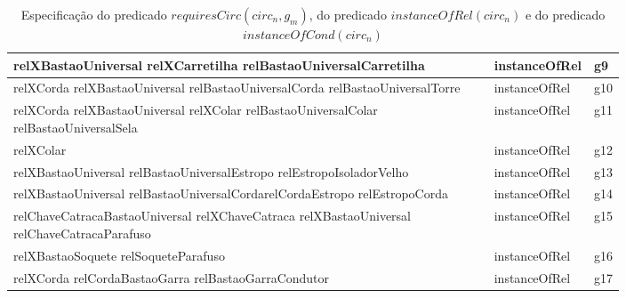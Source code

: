 \begin{table}[H]
\begin{tabular}{|p{0.8\linewidth}|l|l|}
relXBastaoUniversal relXCarretilha relBastaoUniversalCarretilha                                                             & instanceOfRel              		 & g9         \\ \hline
relXCorda relXBastaoUniversal relBastaoUniversalCorda relBastaoUniversalTorre                                               & instanceOfRel              		 & g10        \\ \hline
relXCorda relXBastaoUniversal relXColar relBastaoUniversalColar relBastaoUniversalSela                                      & instanceOfRel              		 & g11        \\ \hline
relXColar                                                                                                                   & instanceOfRel              		 & g12        \\ \hline
relXBastaoUniversal relBastaoUniversalEstropo relEstropoIsoladorVelho                                                       & instanceOfRel              		 & g13        \\ \hline
relXBastaoUniversal relBastaoUniversalCordarelCordaEstropo relEstropoCorda                                                  & instanceOfRel              		 & g14        \\ \hline
relChaveCatracaBastaoUniversal relXChaveCatraca relXBastaoUniversal relChaveCatracaParafuso                                 & instanceOfRel              		 & g15        \\ \hline
relXBastaoSoquete relSoqueteParafuso                                                                                        & instanceOfRel              		 & g16        \\ \hline
relXCorda relCordaBastaoGarra relBastaoGarraCondutor                                                                        & instanceOfRel              		 & g17        \\ \hline
\end{tabular}
\caption{Especificação do predicado $requiresCirc(circ_n,g_m)$, do predicado $instanceOfRel(circ_n)$ e do predicado $instanceOfCond(circ_n)$}
\label{relationsgroup1}
\end{table}



